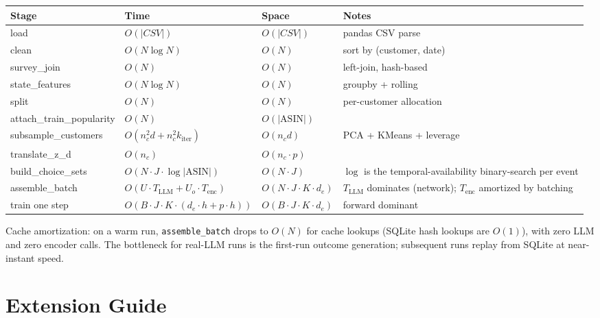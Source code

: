 \documentclass[11pt,a4paper]{article}
\begin{document}
\begin{center}
\small
\begin{tabular}{@{}l l l l@{}}
\toprule
Stage & Time & Space & Notes \\
\midrule
load                       & $O(|CSV|)$      & $O(|CSV|)$       & pandas CSV parse \\
clean                      & $O(N \log N)$   & $O(N)$           & sort by (customer, date) \\
survey\_join               & $O(N)$          & $O(N)$           & left-join, hash-based \\
state\_features            & $O(N \log N)$   & $O(N)$           & groupby + rolling \\
split                      & $O(N)$          & $O(N)$           & per-customer allocation \\
attach\_train\_popularity  & $O(N)$          & $O(|\text{ASIN}|)$ & \\
subsample\_customers       & $O(n_c^2 d + n_c^2 k_{\text{iter}})$ & $O(n_c d)$ & PCA + KMeans + leverage \\
translate\_z\_d            & $O(n_c)$        & $O(n_c \cdot p)$ & \\
build\_choice\_sets        & $O(N \cdot J \cdot \log |\text{ASIN}|)$ & $O(N \cdot J)$ & $\log$ is the temporal-availability binary-search per event \\
assemble\_batch            & $O(U \cdot T_{\text{LLM}} + U_o \cdot T_{\text{enc}})$ & $O(N \cdot J \cdot K \cdot d_e)$ & $T_{\text{LLM}}$ dominates (network); $T_{\text{enc}}$ amortized by batching \\
train one step             & $O(B \cdot J \cdot K \cdot (d_e \cdot h + p \cdot h))$ & $O(B \cdot J \cdot K \cdot d_e)$ & forward dominant \\
\bottomrule
\end{tabular}
\end{center}

Cache amortization: on a warm run, \texttt{assemble\_batch} drops to
$O(N)$ for cache lookups (SQLite hash lookups are $O(1)$), with zero
LLM and zero encoder calls. The bottleneck for real-LLM runs is the
first-run outcome generation; subsequent runs replay from SQLite at
near-instant speed.

\section{Extension Guide}
\label{sec:extend}
\end{document}
